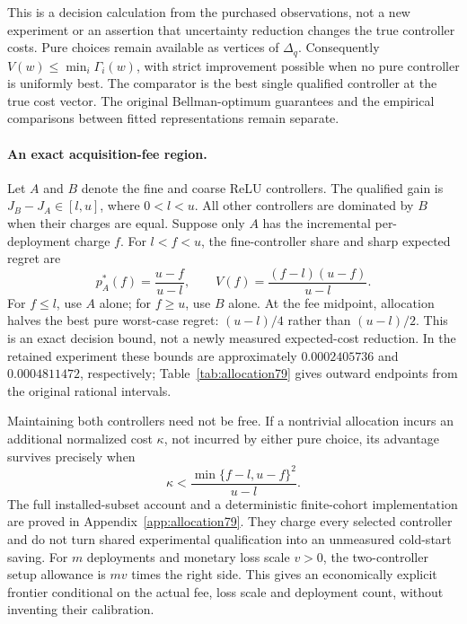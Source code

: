 This is a decision calculation from the purchased observations, not a new experiment or an assertion that uncertainty reduction changes the true controller costs. Pure choices remain available as vertices of $\Delta_q$. Consequently $V(w)\le\min_i\Gamma_i(w)$, with strict improvement possible when no pure controller is uniformly best. The comparator is the best single qualified controller at the true cost vector. The original Bellman-optimum guarantees and the empirical comparisons between fitted representations remain separate.

\paragraph{An exact acquisition-fee region.}
Let $A$ and $B$ denote the fine and coarse ReLU controllers. The qualified gain is $J_B-J_A\in[l,u]$, where $0<l<u$. All other controllers are dominated by $B$ when their charges are equal. Suppose only $A$ has the incremental per-deployment charge $f$. For $l<f<u$, the fine-controller share and sharp expected regret are
\begin{equation}\label{eq:two-allocation79}
 p_A^*(f)=\frac{u-f}{u-l},\qquad
 V(f)=\frac{(f-l)(u-f)}{u-l}.
\end{equation}
For $f\le l$, use $A$ alone; for $f\ge u$, use $B$ alone. At the fee midpoint, allocation halves the best pure worst-case regret: $(u-l)/4$ rather than $(u-l)/2$. This is an exact decision bound, not a newly measured expected-cost reduction. In the retained experiment these bounds are approximately $0.0002405736$ and $0.0004811472$, respectively; Table~\ref{tab:allocation79} gives outward endpoints from the original rational intervals.

Maintaining both controllers need not be free. If a nontrivial allocation incurs an additional normalized cost $\kappa$, not incurred by either pure choice, its advantage survives precisely when
\begin{equation}\label{eq:setup-threshold79}
 \kappa<\frac{\min\{f-l,u-f\}^{2}}{u-l}.
\end{equation}
The full installed-subset account and a deterministic finite-cohort implementation are proved in Appendix~\ref{app:allocation79}. They charge every selected controller and do not turn shared experimental qualification into an unmeasured cold-start saving. For $m$ deployments and monetary loss scale $v>0$, the two-controller setup allowance is $mv$ times the right side. This gives an economically explicit frontier conditional on the actual fee, loss scale and deployment count, without inventing their calibration.
